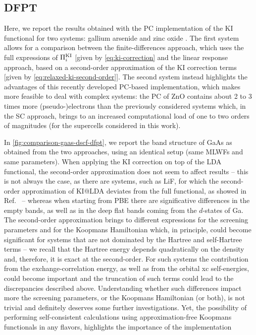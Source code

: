 \subsection{DFPT\label{sec:results-dfpt}}
Here, we report the results obtained with the PC implementation of the KI functional for two systems: gallium arsenide and zinc oxide \cite{colonna_koopmans_2022}. The first system allows for a comparison between the finite-differences approach, which uses the full expressions of $\Pi_i^{\rm KI}$ [given by \cref{eq:ki-correction} and the linear response approach, based on a second-order approximation of the KI correction terms [given by \cref{eq:relaxed-ki-second-order}]. The second system instead highlights the advantages of this recently developed PC-based implementation, which makes more feasible to deal with complex systems: the PC of ZnO contains about 2 to 3 times more (pseudo-)electrons than the previously considered systems which, in the SC approach, brings to an increased computational load of one to two orders of magnitudes (for the supercells considered in this work).

In \cref{fig:comparison-gaas-dscf-dfpt}, we report the band structure of GaAs as obtained from the two approaches, using an identical setup (same MLWFs and same parameters). When applying the KI correction on top of the LDA functional, the second-order approximation does not seem to affect results -- this is not always the case, as there are systems, such as LiF, for which the second-order approximation of KI@LDA deviates from the full functional, as showed in Ref.~\cite{colonna_koopmans_2022} -- whereas when starting from PBE there are significative differences in the empty bands, as well as in the deep flat bands coming from the $d$-states of Ga. The second-order approximation brings to different expressions for the screening parameters and for the Koopmans Hamiltonian which, in principle, could become significant for systems that are not dominated by the Hartree and self-Hartree terms -- we recall that the Hartree energy depends quadratically on the density and, therefore, it is exact at the second-order. For such systems the contribution from the exchange-correlation energy, as well as from the orbital xc self-energies, could become important and the truncation of such terms could lead to the discrepancies described above. Understanding whether such differences impact more the screening parameters, or the Koopmans Hamiltonian (or both), is not trivial and definitely deserves some further investigations. Yet, the possibility of performing self-consistent calculations using approximation-free Koopmans functionals in any flavors, highlights the importance of the \kcp implementation 

